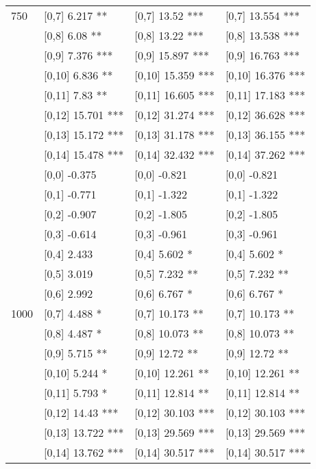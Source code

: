 \begin{table}
\begin{tabular}[t]{llll}
750 & {}[0,7] 6.217 ** & {}[0,7] 13.52 *** & {}[0,7] 13.554 ***\\
 & {}[0,8] 6.08 ** & {}[0,8] 13.22 *** & {}[0,8] 13.538 ***\\
 & {}[0,9] 7.376 *** & {}[0,9] 15.897 *** & {}[0,9] 16.763 ***\\
\addlinespace
 & {}[0,10] 6.836 ** & {}[0,10] 15.359 *** & {}[0,10] 16.376 ***\\
 & {}[0,11] 7.83 ** & {}[0,11] 16.605 *** & {}[0,11] 17.183 ***\\
 & {}[0,12] 15.701 *** & {}[0,12] 31.274 *** & {}[0,12] 36.628 ***\\
 & {}[0,13] 15.172 *** & {}[0,13] 31.178 *** & {}[0,13] 36.155 ***\\
 & {}[0,14] 15.478 *** & {}[0,14] 32.432 *** & {}[0,14] 37.262 ***\\
\addlinespace
 & {}[0,0] -0.375 & {}[0,0] -0.821 & {}[0,0] -0.821\\
 & {}[0,1] -0.771 & {}[0,1] -1.322 & {}[0,1] -1.322\\
 & {}[0,2] -0.907 & {}[0,2] -1.805 & {}[0,2] -1.805\\
 & {}[0,3] -0.614 & {}[0,3] -0.961 & {}[0,3] -0.961\\
 & {}[0,4] 2.433 & {}[0,4] 5.602 * & {}[0,4] 5.602 *\\
\addlinespace
 & {}[0,5] 3.019 & {}[0,5] 7.232 ** & {}[0,5] 7.232 **\\
 & {}[0,6] 2.992 & {}[0,6] 6.767 * & {}[0,6] 6.767 *\\
1000 & {}[0,7] 4.488 * & {}[0,7] 10.173 ** & {}[0,7] 10.173 **\\
 & {}[0,8] 4.487 * & {}[0,8] 10.073 ** & {}[0,8] 10.073 **\\
 & {}[0,9] 5.715 ** & {}[0,9] 12.72 ** & {}[0,9] 12.72 **\\
\addlinespace
 & {}[0,10] 5.244 * & {}[0,10] 12.261 ** & {}[0,10] 12.261 **\\
 & {}[0,11] 5.793 * & {}[0,11] 12.814 ** & {}[0,11] 12.814 **\\
 & {}[0,12] 14.43 *** & {}[0,12] 30.103 *** & {}[0,12] 30.103 ***\\
 & {}[0,13] 13.722 *** & {}[0,13] 29.569 *** & {}[0,13] 29.569 ***\\
 & {}[0,14] 13.762 *** & {}[0,14] 30.517 *** & {}[0,14] 30.517 ***\\
\bottomrule
\end{tabular}
\end{table}
